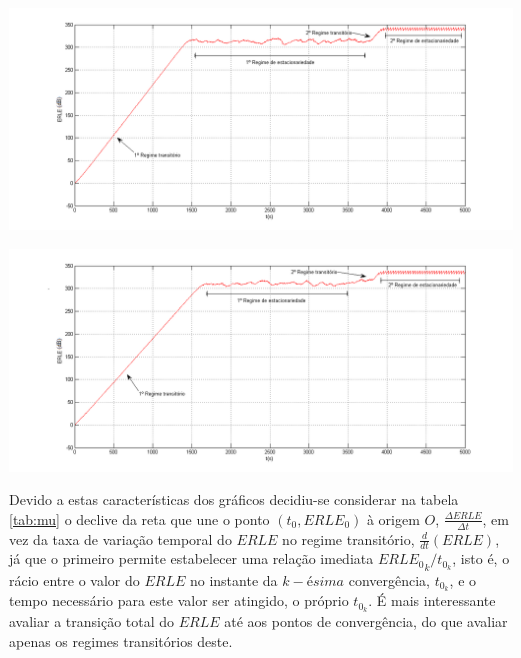 \documentclass[a4paper,11pt]{report}
\begin{document}
\begin{center}
     \includegraphics[angle=0,width=1\textwidth]{mu00250.png}
     \label{fig:mu00250}
       \end{center}
  

\begin{center}
     \includegraphics[angle=0,width=1\textwidth]{mu00275.png}
     \label{fig:mu00275}
     \end{center}

Devido a estas características dos gráficos decidiu-se considerar na tabela \ref{tab:mu} o declive da reta que une o ponto $(t_0,ERLE_{0})$ à origem $O$, $\frac{\Delta ERLE}{\Delta t}$, em vez da taxa de variação temporal do $ERLE$ no regime transitório, $\frac{d}{dt}\left(ERLE\right)$, já que o primeiro permite estabelecer uma relação imediata ${ERLE_0}_k/t_{0_k}$, isto é, o rácio entre o valor do $ERLE$ no instante da $k-ésima$ convergência, $t_{0_k}$, e o tempo necessário para este valor ser atingido, o próprio $t_{0_k}$. É mais interessante avaliar a transição total do $ERLE$  até aos pontos de convergência, do que avaliar apenas os regimes transitórios deste.  \\
\end{document}
